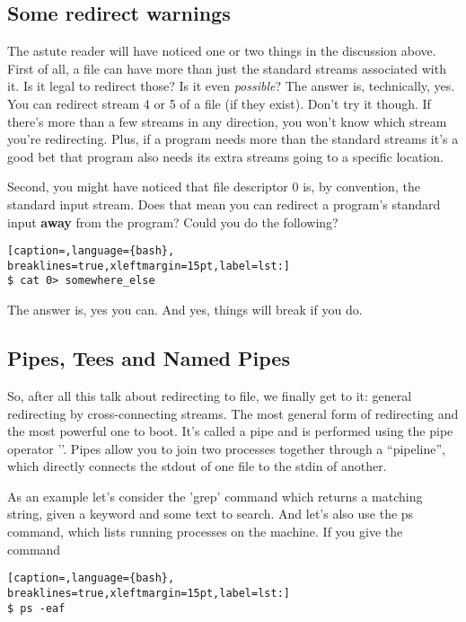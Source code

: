 \subsection{Some redirect warnings}
The astute reader will have noticed one or two things in the discussion above.
First of all, a file can have more than just the standard streams associated
with it. Is it legal to redirect those? Is it even \emph{possible}? The answer
is, technically, yes. You can redirect stream 4 or 5 of a file (if they exist).
Don't try it though. If there's more than a few streams in any direction, you
won't know which stream you're redirecting. Plus, if a program needs more than
the standard streams it's a good bet that program also needs its extra streams
going to a specific location.

Second, you might have noticed that file descriptor 0 is, by convention, the
standard input stream. Does that mean you can redirect a program's standard
input \textbf{away} from the program? Could you do the following?
\lstset{basicstyle=\scriptsize, numbers=left, captionpos=b, tabsize=4}
\begin{lstlisting}[caption=,language={bash},
breaklines=true,xleftmargin=15pt,label=lst:]
$ cat 0> somewhere_else
\end{lstlisting}

The answer is, yes you can. And yes, things will break if you do.

\subsection{Pipes, Tees and Named Pipes}
So, after all this talk about redirecting to file, we finally get to it:
general redirecting by cross-connecting streams. The most general form of
redirecting and the most powerful one to boot. It's called a pipe and is
performed using the pipe operator '\textbar{}'. Pipes allow you to join two
processes together through a ``pipeline'', which directly connects the stdout
of one file to the stdin of another.

As an example let's consider the 'grep' command which returns a matching
string, given a keyword and some text to search. And let's also use the ps
command, which lists running processes on the machine. If you give the command 

\lstset{basicstyle=\scriptsize, numbers=left, captionpos=b, tabsize=4}
\begin{lstlisting}[caption=,language={bash},
breaklines=true,xleftmargin=15pt,label=lst:]
$ ps -eaf
\end{lstlisting}

